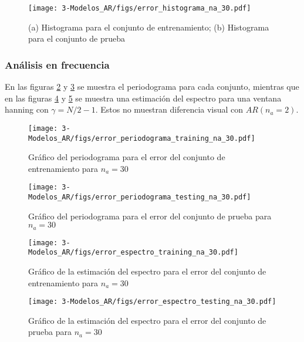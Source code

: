 \begin{figure}[H]
	\centering
	\texttt{[image: 3-Modelos\_AR/figs/error\_histograma\_na\_30.pdf]}
	\caption{(a) Histograma para el conjunto de entrenamiento; (b) Histograma para el conjunto de prueba}
	\label{fig:M3_histograma_error_na30}
\end{figure}

\subsubsection*{Análisis en frecuencia}


En las figuras \ref{fig:M3_error_periodograma_train_na30} y \ref{fig:M3_error_periodograma_test_na30} se muestra el periodograma para cada conjunto, mientras que en las figuras \ref{fig:M3_error_espectro_train_na30} y \ref{fig:M3_error_espectro_test_na30} se muestra una estimación del espectro para una ventana hanning con $\gamma = N/2 - 1$. Estos no muestran diferencia visual con $AR(n_a=2)$. 


\begin{figure}[H]
	\centering
	\texttt{[image: 3-Modelos\_AR/figs/error\_periodograma\_training\_na\_30.pdf]}
	\caption{Gráfico del periodograma para el error del conjunto de entrenamiento para $n_a = 30$}
	\label{fig:M3_error_periodograma_train_na30}
\end{figure}

\begin{figure}[H]
	\centering
	\texttt{[image: 3-Modelos\_AR/figs/error\_periodograma\_testing\_na\_30.pdf]}
	\caption{Gráfico del periodograma para el error del conjunto de prueba para $n_a = 30$}
	\label{fig:M3_error_periodograma_test_na30}
\end{figure}

\begin{figure}[H]
	\centering
	\texttt{[image: 3-Modelos\_AR/figs/error\_espectro\_training\_na\_30.pdf]}
	\caption{Gráfico de la estimación del espectro para el error del conjunto de entrenamiento para $n_a = 30$}
	\label{fig:M3_error_espectro_train_na30}
\end{figure}

\begin{figure}[H]
	\centering
	\texttt{[image: 3-Modelos\_AR/figs/error\_espectro\_testing\_na\_30.pdf]}
	\caption{Gráfico de la estimación del espectro para el error del conjunto de prueba para $n_a = 30$}
	\label{fig:M3_error_espectro_test_na30}
\end{figure}

